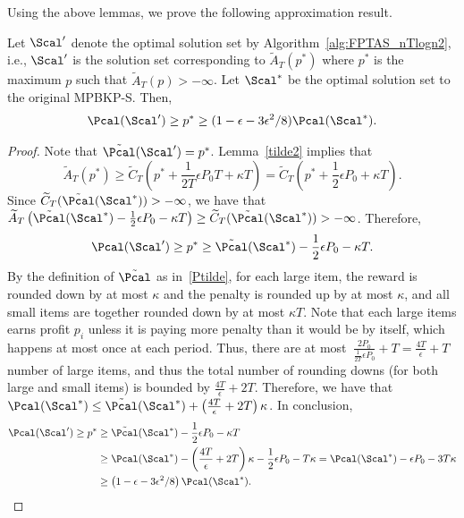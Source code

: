 Using the above lemmas, we prove the following approximation result.
\begin{proposition}\label{MPBKPapprox2}
Let $\Scal'$ denote the optimal solution set by Algorithm~\ref{alg:FPTAS_nTlogn2}, i.e., $\Scal'$ is the solution set corresponding to $\widetilde{A}_T(p^*)$ where $p^*$ is the maximum $p$ such that $\widetilde{A}_T(p)>-\infty$. Let $\Scal^*$ be the optimal solution set to the original MPBKP-S. Then, 
\begin{align*}
\Pcal(\Scal')\ge p^*\ge (1-\epsilon-3\epsilon^2/8)\Pcal(\Scal^*).
\end{align*}
\end{proposition}
\begin{proof}
Note that $\tilde{\Pcal}(\Scal') = p^*$. Lemma~\ref{tilde2} implies that $$\widetilde{A}_T(p^*)\ge \widetilde{C}_T\left(p^*+\frac{1}{2T}\epsilon P_0T+\kappa T\right)=\widetilde{C}_T\left(p^*+\frac{1}{2}\epsilon P_0+\kappa T\right).$$ Since $\widetilde{C}_T(\tilde{\Pcal}(\Scal^*))>-\infty$, we have that $\widetilde{A}_T\left(\tilde{\Pcal}(\Scal^*)-\frac{1}{2}\epsilon P_0-\kappa T\right)\ge \widetilde{C}_T(\tilde{\Pcal}(\Scal^*))>-\infty$. Therefore,
$$
\Pcal(\Scal') \ge p^* \ge \tilde{\Pcal}(\Scal^*)-\frac{1}{2}\epsilon P_0 - \kappa T.
$$
By the definition of $\tilde{\Pcal}$ as in~\eqref{Ptilde}, for each large item, the reward is rounded down by at most $\kappa$ and the penalty is rounded up by at most $\kappa$, and all small items are together rounded down by at most $\kappa T$. Note that each large items earns profit $p_i$ unless it is paying more penalty than it would be by itself, which happens at most once at each period. Thus, there are at most~$\frac{2P_0}{\frac{1}{2T}\epsilon P_0} + T=\frac{4T}{\epsilon} +T$ number of large items, and thus the total number of rounding downs (for both large and small items) is bounded by $\frac{4T}{\epsilon}+2T$. Therefore, we have that $\Pcal(\Scal^*)\le \tilde{\Pcal}(\Scal^*)+\left(\frac{4T}{\epsilon}+2T\right)\kappa$. In conclusion, 
\begin{align*}
\Pcal(\Scal') \ge p^* &\ge \tilde{\Pcal}(\Scal^*)-\frac{1}{2}\epsilon P_0 -\kappa T\\&\ge \Pcal(\Scal^*)-\left(\frac{4T}{\epsilon}+2T\right)\kappa-\frac{1}{2}\epsilon P_0-T\kappa= \Pcal(\Scal^*)-\epsilon P_0-3T\kappa\\
&\ge \left(1-\epsilon-3\epsilon^2/8\right)\Pcal(\Scal^*).
\end{align*}
\end{proof}

